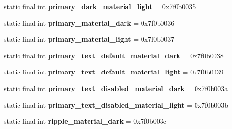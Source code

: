 \begin{DoxyCompactItemize}
\item 
\hypertarget{classandroid_1_1support_1_1design_1_1_r_1_1color_a25d5d8ccf48a63bdcd173ed25e84d186}{}static final int {\bfseries primary\+\_\+dark\+\_\+material\+\_\+light} = 0x7f0b0035\label{classandroid_1_1support_1_1design_1_1_r_1_1color_a25d5d8ccf48a63bdcd173ed25e84d186}

\item 
\hypertarget{classandroid_1_1support_1_1design_1_1_r_1_1color_a7af93f82b377f51a011497200729e857}{}static final int {\bfseries primary\+\_\+material\+\_\+dark} = 0x7f0b0036\label{classandroid_1_1support_1_1design_1_1_r_1_1color_a7af93f82b377f51a011497200729e857}

\item 
\hypertarget{classandroid_1_1support_1_1design_1_1_r_1_1color_a20aa169940dc7ef70408191713f62b84}{}static final int {\bfseries primary\+\_\+material\+\_\+light} = 0x7f0b0037\label{classandroid_1_1support_1_1design_1_1_r_1_1color_a20aa169940dc7ef70408191713f62b84}

\item 
\hypertarget{classandroid_1_1support_1_1design_1_1_r_1_1color_aca4a2383fca5f6ccb557cfe94ebba6c0}{}static final int {\bfseries primary\+\_\+text\+\_\+default\+\_\+material\+\_\+dark} = 0x7f0b0038\label{classandroid_1_1support_1_1design_1_1_r_1_1color_aca4a2383fca5f6ccb557cfe94ebba6c0}

\item 
\hypertarget{classandroid_1_1support_1_1design_1_1_r_1_1color_a2d4f6d12973f5b51169658522eef0883}{}static final int {\bfseries primary\+\_\+text\+\_\+default\+\_\+material\+\_\+light} = 0x7f0b0039\label{classandroid_1_1support_1_1design_1_1_r_1_1color_a2d4f6d12973f5b51169658522eef0883}

\item 
\hypertarget{classandroid_1_1support_1_1design_1_1_r_1_1color_a8a9d0f72c61f70a41ba77788e9736d8a}{}static final int {\bfseries primary\+\_\+text\+\_\+disabled\+\_\+material\+\_\+dark} = 0x7f0b003a\label{classandroid_1_1support_1_1design_1_1_r_1_1color_a8a9d0f72c61f70a41ba77788e9736d8a}

\item 
\hypertarget{classandroid_1_1support_1_1design_1_1_r_1_1color_ac0f7294ee1ed3eedd5a3d26e0c77c5f0}{}static final int {\bfseries primary\+\_\+text\+\_\+disabled\+\_\+material\+\_\+light} = 0x7f0b003b\label{classandroid_1_1support_1_1design_1_1_r_1_1color_ac0f7294ee1ed3eedd5a3d26e0c77c5f0}

\item 
\hypertarget{classandroid_1_1support_1_1design_1_1_r_1_1color_a485c0ef87a8bd8a5ec8d0a7cb74d0fb3}{}static final int {\bfseries ripple\+\_\+material\+\_\+dark} = 0x7f0b003c\label{classandroid_1_1support_1_1design_1_1_r_1_1color_a485c0ef87a8bd8a5ec8d0a7cb74d0fb3}


\end{DoxyCompactItemize}
